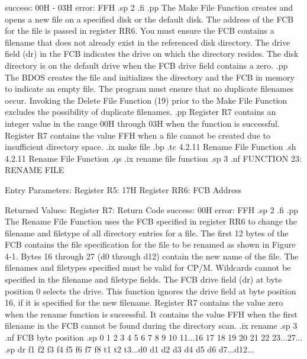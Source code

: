                                 success:  00H - 03H
                                  error:  FFH
.sp 2
.fi
.pp
The Make File Function creates and opens a new file on a
specified disk or the default disk. The address of the FCB for the
file is passed in register  RR6. You must ensure the FCB contains
a filename that does not already exist in the 
referenced disk directory. The drive field (dr) in the FCB
indicates the drive on which the directory resides.  The disk
directory is on the default drive when the FCB drive field
contains a zero. 
.pp
The BDOS creates the file and initializes the directory and
the FCB in memory to indicate an empty file. The program must ensure that no
duplicate filenames occur.  Invoking the Delete File Function
(19) prior to the Make File Function excludes the possibility of
duplicate filenames. 
.pp
Register   R7 contains an integer value in the range 00H through
03H when the function is successful. Register   R7 contains the
value FFH when a file cannot be created due to insufficient directory 
space.
.ix make file
.bp
.tc         4.2.11  Rename File Function 
.sh
4.2.11  Rename File Function
.qs
.ix rename file function
.sp 3
.nf
                   FUNCTION 23:  RENAME FILE

                Entry Parameters:
                   Register   R5:  17H
                   Register  RR6:  FCB Address
                
                Returned  Values:
                   Register   R7:  Return Code
                                   success:  00H
                                     error:  FFH
.sp 2
.fi
.pp
The Rename File Function uses the FCB specified in register  RR6
to change the filename and filetype of all directory entries for
a file. The first 12 bytes of the FCB contains the file
specification for the file to be renamed as shown in Figure 4-1.
Bytes 16 through 27 (d0 through d12) contain the new name of the
file.  The filenames and filetypes specified must be valid for
CP/M. Wildcards cannot be specified in the filename and filetype
fields.  The FCB drive field (dr) at byte position 0 selects the
drive.  This function ignores the drive field at byte position 16,
if it is specified for the new filename. Register   R7 contains the value 
zero when the rename function is successful. It contains the
value FFH when the first filename in the FCB cannot be found
during the directory scan. 
.ix rename
.sp 3
.nf
FCB byte position 
.sp
 0  1  2  3  4  5  6  7  8  9 10 11...16 17 18 19 20 21 22 23...27...
.sp
dr f1 f2 f3 f4 f5 f6 f7 f8 t1 t2 t3...d0 d1 d2 d3 d4 d5 d6 d7...d12...
 
